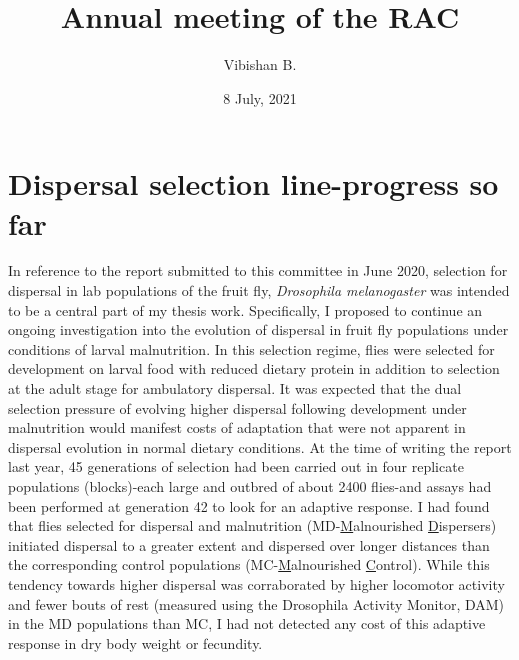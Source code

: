 \documentclass[12pt,onecolumn,twoside]{article}
\author{Vibishan B.}
\affil{Department of Biology, Indian Institute of Science Education and Research (IISER), Pune}
\title{Annual meeting of the RAC}
\date{8 July, 2021}
\begin{document}
	\maketitle
	\section{Dispersal selection line-progress so far}
	In reference to the report submitted to this committee in June 2020, selection for dispersal in lab populations of the fruit fly, \textit{Drosophila melanogaster} was intended to be a central part of my thesis work. Specifically, I proposed to continue an ongoing investigation into the evolution of dispersal in fruit fly populations under conditions of larval malnutrition. In this selection regime, flies were selected for development on larval food with reduced dietary protein in addition to selection at the adult stage for ambulatory dispersal. It was expected that the dual selection pressure of evolving higher dispersal following development under malnutrition would manifest costs of adaptation that were not apparent in dispersal evolution in normal dietary conditions. At the time of writing the report last year, 45 generations of selection had been carried out in four replicate populations (blocks)-each large and outbred of about 2400 flies-and assays had been performed at generation 42 to look for an adaptive response. I had found that flies selected for dispersal and malnutrition (MD-\underline{M}alnourished \underline{D}ispersers) initiated dispersal to a greater extent and dispersed over longer distances than the corresponding control populations (MC-\underline{M}alnourished \underline{C}ontrol). While this tendency towards higher dispersal was corraborated by higher locomotor activity and fewer bouts of rest (measured using the Drosophila Activity Monitor, DAM) in the MD populations than MC, I had not detected any cost of this adaptive response in dry body weight or fecundity.
\end{document}
